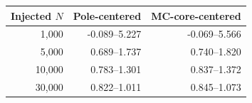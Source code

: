 \begin{tabular}{rrr}
\toprule
Injected $N$ & Pole-centered & MC-core-centered \\
\midrule
1,000 & -0.089--5.227 & -0.069--5.566 \\
5,000 & 0.689--1.737 & 0.740--1.820 \\
10,000 & 0.783--1.301 & 0.837--1.372 \\
30,000 & 0.822--1.011 & 0.845--1.073 \\
\bottomrule
\end{tabular}
